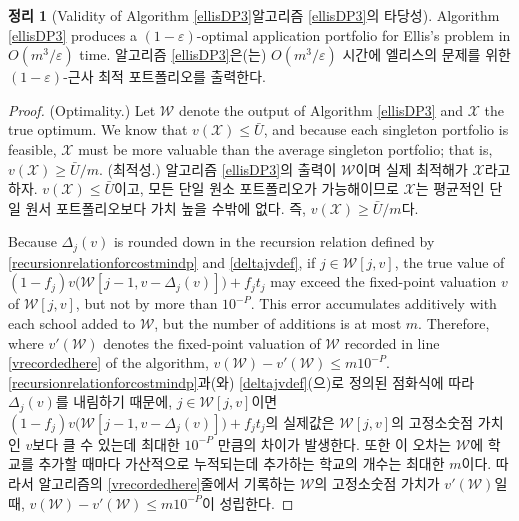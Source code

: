 \documentclass[11pt]{article} %
\newtheorem{theorem}{Theorem}
\theoremstyle{definition}
\newtheorem{theorem}{정리}
\theoremstyle{definition}
\begin{document}
\begin{theorem}[\ifen Validity of Algorithm \ref{ellisDP3}\else 알고리즘 \ref{ellisDP3}의 타당성\fi]
\ifen
Algorithm \ref{ellisDP3} produces a $(1 - \varepsilon)$-optimal application portfolio for Ellis's problem in $O(m^3 /\varepsilon)$ time. %
\else
알고리즘 \ref{ellisDP3}은(는) $O(m^3 /\varepsilon)$ 시간에 엘리스의 문제를 위한 $(1 - \varepsilon)$-근사 최적 포트폴리오를 출력한다.
\fi
\end{theorem}

\begin{proof}
\ifen
(Optimality.) Let $\mathcal{W}$ denote the output of Algorithm \ref{ellisDP3} and $\mathcal{X}$ the true optimum. We know that $v(\mathcal{X}) \leq \bar U$, and because each singleton portfolio is feasible, $\mathcal{X}$ must be more valuable than the average singleton portfolio; that is, $v(\mathcal{X}) \geq \bar U / m$.
\else
(최적성.) 알고리즘 \ref{ellisDP3}의 출력이 $\mathcal{W}$이며 실제 최적해가 $\mathcal{X}$라고 하자. $v(\mathcal{X}) \leq \bar U$이고, 모든 단일 원소 포트폴리오가 가능해이므로  $\mathcal{X}$는 평균적인 단일 원서 포트폴리오보다 가치 높을 수밖에 없다. 즉,  $v(\mathcal{X}) \geq \bar U / m$다.
\fi

\ifen
Because $\Delta_j(v)$ is rounded down in the recursion relation defined by \eqref{recursionrelationforcostmindp} and \eqref{deltajvdef}, if $j \in \mathcal{W}[j, v]$, the true value of $(1 - f_j) v\bigl(\mathcal{W}[j-1, v- \Delta_j(v)]\bigr) + f_j t_j$ may exceed the fixed-point valuation $v$ of $\mathcal{W}[j, v]$, but not by more than $10^{-P}$. This error accumulates additively with each school added to $\mathcal{W}$, but the number of additions is at most $m$. Therefore, where $v'(\mathcal{W})$ denotes the fixed-point valuation of $\mathcal{W}$ recorded in line \ref{vrecordedhere} of the algorithm, 
$v(\mathcal{W}) - v'(\mathcal{W}) \leq m 10^{-P}$.
\else
\eqref{recursionrelationforcostmindp}과(와) \eqref{deltajvdef}(으)로 정의된 점화식에 따라 $\Delta_j(v)$를 내림하기 때문에, $j \in \mathcal{W}[j, v]$이면 $(1 - f_j) v\bigl(\mathcal{W}[j-1, v- \Delta_j(v)]\bigr) + f_j t_j$의 실제값은 $\mathcal{W}[j, v]$의 고정소숫점 가치인 $v$보다 클 수 있는데 최대한 $10^{-P}$ 만큼의 차이가 발생한다. 또한 이 오차는 $\mathcal{W}$에 학교를 추가할 때마다 가산적으로 누적되는데 추가하는 학교의 개수는 최대한 $m$이다. 따라서 알고리즘의 \ref{vrecordedhere}줄에서 기록하는 $\mathcal{W}$의 고정소숫점 가치가 $v'(\mathcal{W})$일 때, $v(\mathcal{W}) - v'(\mathcal{W}) \leq m 10^{-P}$이 성립한다.
\fi


\end{proof}
\end{document}
